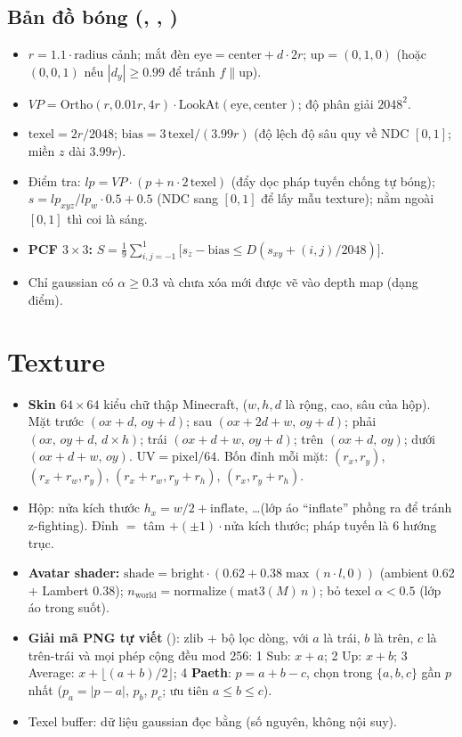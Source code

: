 \subsection{Bản đồ bóng (, , )}
\begin{itemize}
\item $r=1.1\cdot\mathrm{radius}$ cảnh; mắt đèn $\mathrm{eye}=\mathrm{center}+d\cdot2r$; $\mathrm{up}=(0,1,0)$ (hoặc $(0,0,1)$ nếu $|d_y|\ge0.99$ để tránh $f\parallel\mathrm{up}$).
\item $VP=\mathrm{Ortho}(r,0.01r,4r)\cdot\mathrm{LookAt}(\mathrm{eye},\mathrm{center})$; độ phân giải $2048^2$.
\item $\mathrm{texel}=2r/2048$; $\mathrm{bias}=3\,\mathrm{texel}/(3.99r)$ (độ lệch độ sâu quy về NDC $[0,1]$; miền $z$ dài $3.99r$).
\item Điểm tra: $lp=VP\cdot(p+n\cdot2\,\mathrm{texel})$ (đẩy dọc pháp tuyến chống tự bóng); $s=lp_{xyz}/lp_w\cdot0.5+0.5$ (NDC sang $[0,1]$ để lấy mẫu texture); nằm ngoài $[0,1]$ thì coi là sáng.
\item \textbf{PCF $3\times3$:} $S=\frac19\sum_{i,j=-1}^{1}\big[s_z-\mathrm{bias}\le D(s_{xy}+(i,j)/2048)\big]$.
\item Chỉ gaussian có $\alpha\ge0.3$ và chưa xóa mới được vẽ vào depth map (dạng điểm).
\end{itemize}

\section{Texture}
\begin{itemize}
\item \textbf{Skin $64\times64$} kiểu chữ thập Minecraft,  ($w,h,d$ là rộng, cao, sâu của hộp). Mặt trước $(ox+d,\,oy+d)$; sau $(ox+2d+w,\,oy+d)$; phải $(ox,\,oy+d,\,d\times h)$; trái $(ox+d+w,\,oy+d)$; trên $(ox+d,\,oy)$; dưới $(ox+d+w,\,oy)$. $\mathrm{UV}=\mathrm{pixel}/64$. Bốn đỉnh mỗi mặt: $(r_x,r_y)$, $(r_x+r_w,r_y)$, $(r_x+r_w,r_y+r_h)$, $(r_x,r_y+r_h)$.
\item Hộp: nửa kích thước $h_x=w/2+\mathrm{inflate}$, \ldots (lớp áo ``inflate'' phồng ra để tránh z-fighting). Đỉnh $=$ tâm $+(\pm1)\cdot$nửa kích thước; pháp tuyến là 6 hướng trục.
\item \textbf{Avatar shader:} $\mathrm{shade}=\mathrm{bright}\cdot(0.62+0.38\max(n\cdot l,0))$ (ambient 0.62 + Lambert 0.38); $n_{\mathrm{world}}=\mathrm{normalize}(\mathrm{mat3}(M)\,n)$; bỏ texel $\alpha<0.5$ (lớp áo trong suốt).
\item \textbf{Giải mã PNG tự viết} (): zlib + bộ lọc dòng, với $a$ là trái, $b$ là trên, $c$ là trên-trái và mọi phép cộng đều mod 256: 1 Sub: $x+a$; 2 Up: $x+b$; 3 Average: $x+\lfloor(a+b)/2\rfloor$; 4 \textbf{Paeth}: $p=a+b-c$, chọn trong $\{a,b,c\}$ gần $p$ nhất ($p_a=|p-a|$, $p_b$, $p_c$; ưu tiên $a\le b\le c$).
\item Texel buffer: dữ liệu gaussian đọc bằng  (số nguyên, không nội suy).
\end{itemize}

